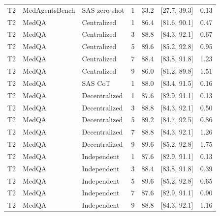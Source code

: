 \begin{table}[t]
\begin{tabular}{@{}llllrrr@{}}
T2 & MedAgentsBench & SAS zero-shot & 1 & 33.2 & [27.7, 39.3] & 0.13 \\
T2 & MedQA & Centralized & 1 & 86.4 & [81.6, 90.1] & 0.47 \\
T2 & MedQA & Centralized & 3 & 88.8 & [84.3, 92.1] & 0.67 \\
T2 & MedQA & Centralized & 5 & 89.6 & [85.2, 92.8] & 0.95 \\
T2 & MedQA & Centralized & 7 & 88.4 & [83.8, 91.8] & 1.23 \\
T2 & MedQA & Centralized & 9 & 86.0 & [81.2, 89.8] & 1.51 \\
T2 & MedQA & SAS CoT & 1 & 88.0 & [83.4, 91.5] & 0.16 \\
T2 & MedQA & Decentralized & 1 & 87.6 & [82.9, 91.1] & 0.13 \\
T2 & MedQA & Decentralized & 3 & 88.8 & [84.3, 92.1] & 0.50 \\
T2 & MedQA & Decentralized & 5 & 89.2 & [84.7, 92.5] & 0.86 \\
T2 & MedQA & Decentralized & 7 & 88.8 & [84.3, 92.1] & 1.26 \\
T2 & MedQA & Decentralized & 9 & 89.6 & [85.2, 92.8] & 1.75 \\
T2 & MedQA & Independent & 1 & 87.6 & [82.9, 91.1] & 0.13 \\
T2 & MedQA & Independent & 3 & 88.4 & [83.8, 91.8] & 0.39 \\
T2 & MedQA & Independent & 5 & 89.6 & [85.2, 92.8] & 0.65 \\
T2 & MedQA & Independent & 7 & 87.6 & [82.9, 91.1] & 0.90 \\
T2 & MedQA & Independent & 9 & 88.8 & [84.3, 92.1] & 1.16 \\
\bottomrule
\end{tabular}
\end{table}

